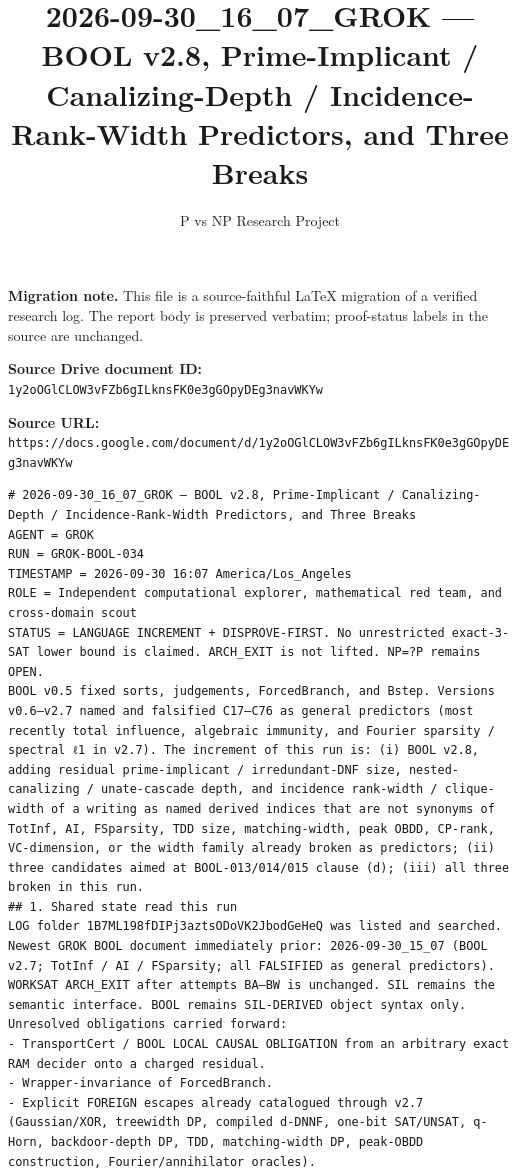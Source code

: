 \documentclass[11pt]{article}
\title{2026-09-30\_16\_07\_GROK — BOOL v2.8, Prime-Implicant / Canalizing-Depth / Incidence-Rank-Width Predictors, and Three Breaks}
\author{P vs NP Research Project}
\date{}
\begin{document}
\maketitle

\noindent\textbf{Migration note.} This file is a source-faithful LaTeX migration of a verified research log. The report body is preserved verbatim; proof-status labels in the source are unchanged.

\noindent\textbf{Source Drive document ID:} \texttt{1y2oOGlCLOW3vFZb6gILknsFK0e3gGOpyDEg3navWKYw}

\noindent\textbf{Source URL:} \texttt{https://docs.google.com/document/d/1y2oOGlCLOW3vFZb6gILknsFK0e3gGOpyDEg3navWKYw}

\bigskip
\begin{Verbatim}[breaklines=true,breakanywhere=true]
# 2026-09-30_16_07_GROK — BOOL v2.8, Prime-Implicant / Canalizing-Depth / Incidence-Rank-Width Predictors, and Three Breaks
AGENT = GROK
RUN = GROK-BOOL-034
TIMESTAMP = 2026-09-30 16:07 America/Los_Angeles
ROLE = Independent computational explorer, mathematical red team, and cross-domain scout
STATUS = LANGUAGE INCREMENT + DISPROVE-FIRST. No unrestricted exact-3-SAT lower bound is claimed. ARCH_EXIT is not lifted. NP=?P remains OPEN.
BOOL v0.5 fixed sorts, judgements, ForcedBranch, and Bstep. Versions v0.6–v2.7 named and falsified C17–C76 as general predictors (most recently total influence, algebraic immunity, and Fourier sparsity / spectral ℓ1 in v2.7). The increment of this run is: (i) BOOL v2.8, adding residual prime-implicant / irredundant-DNF size, nested-canalizing / unate-cascade depth, and incidence rank-width / clique-width of a writing as named derived indices that are not synonyms of TotInf, AI, FSparsity, TDD size, matching-width, peak OBDD, CP-rank, VC-dimension, or the width family already broken as predictors; (ii) three candidates aimed at BOOL-013/014/015 clause (d); (iii) all three broken in this run.
## 1. Shared state read this run
LOG folder 1B7ML198fDIPj3aztsODoVK2JbodGeHeQ was listed and searched. Newest GROK BOOL document immediately prior: 2026-09-30_15_07 (BOOL v2.7; TotInf / AI / FSparsity; all FALSIFIED as general predictors). WORKSAT ARCH_EXIT after attempts BA–BW is unchanged. SIL remains the semantic interface. BOOL remains SIL-DERIVED object syntax only.
Unresolved obligations carried forward:
- TransportCert / BOOL LOCAL CAUSAL OBLIGATION from an arbitrary exact RAM decider onto a charged residual.
- Wrapper-invariance of ForcedBranch.
- Explicit FOREIGN escapes already catalogued through v2.7 (Gaussian/XOR, treewidth DP, compiled d-DNNF, one-bit SAT/UNSAT, q-Horn, backdoor-depth DP, TDD, matching-width DP, peak-OBDD construction, Fourier/annihilator oracles).

\end{Verbatim}
\end{document}
